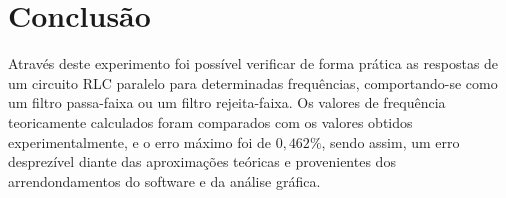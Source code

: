 \newpage
\section{Conclusão}

Através deste experimento foi possível verificar de forma prática as respostas de um circuito RLC paralelo para determinadas frequências, comportando-se como um filtro passa-faixa ou um filtro rejeita-faixa. Os valores de frequência teoricamente calculados foram comparados com os valores obtidos experimentalmente, e o erro máximo foi de $0,462\%$, sendo assim, um erro desprezível diante das aproximações teóricas e provenientes dos arrendondamentos do software e da análise gráfica.

\pagebreak